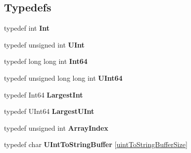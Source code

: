 \subsection*{Typedefs}
\begin{DoxyCompactItemize}
\item 
\hypertarget{namespace_json_a08122e8005b706d982e48cca1e2119c7}{typedef int {\bfseries Int}}\label{namespace_json_a08122e8005b706d982e48cca1e2119c7}

\item 
\hypertarget{namespace_json_a800fb90eb6ee8d5d62b600c06f87f7d4}{typedef unsigned int {\bfseries U\+Int}}\label{namespace_json_a800fb90eb6ee8d5d62b600c06f87f7d4}

\item 
\hypertarget{namespace_json_ab7b47d2905da3b4ae60e4e800ec9ae5f}{typedef long long int {\bfseries Int64}}\label{namespace_json_ab7b47d2905da3b4ae60e4e800ec9ae5f}

\item 
\hypertarget{namespace_json_a01f20bce8f8229f38ff890168c0e6452}{typedef unsigned long long int {\bfseries U\+Int64}}\label{namespace_json_a01f20bce8f8229f38ff890168c0e6452}

\item 
\hypertarget{namespace_json_a218d880af853ce786cd985e82571d297}{typedef Int64 {\bfseries Largest\+Int}}\label{namespace_json_a218d880af853ce786cd985e82571d297}

\item 
\hypertarget{namespace_json_ae202ecad69725e23443f465e257456d0}{typedef U\+Int64 {\bfseries Largest\+U\+Int}}\label{namespace_json_ae202ecad69725e23443f465e257456d0}

\item 
\hypertarget{namespace_json_a8048e741f2177c3b5d9ede4a5b8c53c2}{typedef unsigned int {\bfseries Array\+Index}}\label{namespace_json_a8048e741f2177c3b5d9ede4a5b8c53c2}

\item 
\hypertarget{namespace_json_a602bcf69c2042fb61c3b243cb16f04ca}{typedef char {\bfseries U\+Int\+To\+String\+Buffer} \mbox{[}\hyperlink{namespace_json_a0c5f614b019f20b4598dcaec09d9e820ae4f2008c7919f20d81286121d1374424}{uint\+To\+String\+Buffer\+Size}\mbox{]}}\label{namespace_json_a602bcf69c2042fb61c3b243cb16f04ca}

\end{DoxyCompactItemize}
